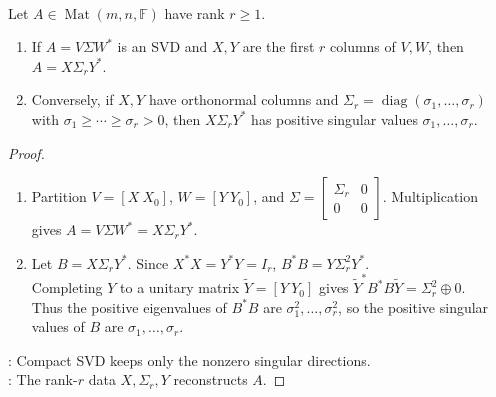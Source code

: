 \begin{theorem} \label{thm:compact-singular-value-decomposition} \\
Let $A\in\operatorname{Mat}(m,n,\mathbb{F})$ have rank $r\geq1$.
\begin{enumerate}[label=(\roman*)]
\setlength{\itemsep}{0pt}
\item If $A=V\Sigma W^*$ is an SVD and $X,Y$ are the first $r$ columns of $V,W$, then $A=X\Sigma_rY^*$.
\item Conversely, if $X,Y$ have orthonormal columns and $\Sigma_r=\operatorname{diag}(\sigma_1,\ldots,\sigma_r)$ with $\sigma_1\geq\cdots\geq\sigma_r>0$, then $X\Sigma_rY^*$ has positive singular values $\sigma_1,\ldots,\sigma_r$.
\end{enumerate}
\begin{proof}
\begin{enumerate}[label=(\roman*)]
\setlength{\itemsep}{0pt}
\item Partition $V=[X\ X_0]$, $W=[Y\ Y_0]$, and $\Sigma=
\begin{bmatrix}
\Sigma_r & 0\\
0 & 0
\end{bmatrix}$. Multiplication gives $A=V\Sigma W^*=X\Sigma_rY^*$.
\item Let $B=X\Sigma_rY^*$. Since $X^{*}X=Y^{*}Y=I_r$, $B^{*}B=Y\Sigma_r^{2}Y^{*}$.\\
Completing $Y$ to a unitary matrix $\widetilde{Y}=[Y\ Y_0]$ gives $\widetilde{Y}^*B^*B\widetilde{Y}=\Sigma_r^2\oplus0$.\\
Thus the positive eigenvalues of $B^*B$ are $\sigma_1^2,\ldots,\sigma_r^2$, so the positive singular values of $B$ are $\sigma_1,\ldots,\sigma_r$.
\end{enumerate}
: Compact SVD keeps only the nonzero singular directions.\\
: The rank-$r$ data $X,\Sigma_r,Y$ reconstructs $A$.
\end{proof}
\end{theorem}

